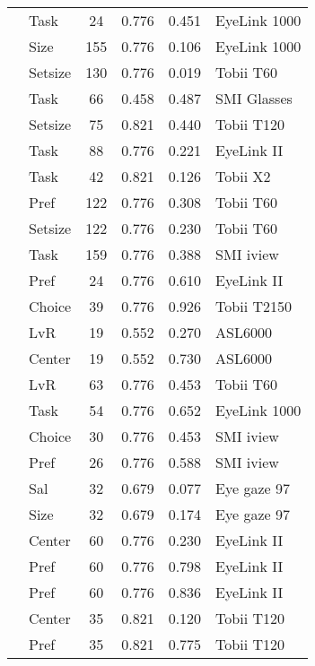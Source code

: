 \begin{longtable}{p{8cm}lcccl}
  \cite{glaholt2012} & Task & 24 & 0.776 & 0.451 & EyeLink 1000 \\ 
  \cite{graham2016} & Size & 155 & 0.776 & 0.106 & EyeLink 1000 \\ 
  \cite{grebitus2015} & Setsize & 130 & 0.776 & 0.019 & Tobii T60 \\ 
  \cite{guyader2017} & Task & 66 & 0.458 & 0.487 & SMI Glasses \\ 
  \cite{hong2016a} & Setsize & 75 & 0.821 & 0.440 & Tobii T120 \\ 
  \cite{huang2011} & Task & 88 & 0.776 & 0.221 & EyeLink II \\ 
  \cite{hwang2017} & Task & 42 & 0.821 & 0.126 & Tobii X2 \\ 
  \cite{jenke2019} & Pref & 122 & 0.776 & 0.308 & Tobii T60 \\ 
  \cite{jenke2019} & Setsize & 122 & 0.776 & 0.230 & Tobii T60 \\ 
  \cite{keller2014} & Task & 159 & 0.776 & 0.388 & SMI iview \\ 
  \cite{kim2012a} & Pref & 24 & 0.776 & 0.610 & EyeLink II \\ 
  \cite{krajbich2010a} & Choice & 39 & 0.776 & 0.926 & Tobii T2150 \\ 
  \cite{kreplin2014a} & LvR & 19 & 0.552 & 0.270 & ASL6000 \\ 
  \cite{kreplin2014a} & Center & 19 & 0.552 & 0.730 & ASL6000 \\ 
  \cite{kwak2018} & LvR & 63 & 0.776 & 0.453 & Tobii T60 \\ 
  \cite{leboeuf2016} & Task & 54 & 0.776 & 0.652 & EyeLink 1000 \\ 
  \cite{lindner2014} & Choice & 30 & 0.776 & 0.453 & SMI iview \\ 
  \cite{lindner2014} & Pref & 26 & 0.776 & 0.588 & SMI iview \\ 
  \cite{lohse1997a} & Sal & 32 & 0.679 & 0.077 & Eye gaze 97 \\ 
  \cite{lohse1997a} & Size & 32 & 0.679 & 0.174 & Eye gaze 97 \\ 
  \cite{meissner2016a} & Center & 60 & 0.776 & 0.230 & EyeLink II \\ 
  \cite{meissner2016a} & Pref & 60 & 0.776 & 0.798 & EyeLink II \\ 
  \cite{meissner2016a} & Pref & 60 & 0.776 & 0.836 & EyeLink II \\ 
  \cite{meissner2016a} & Center & 35 & 0.821 & 0.120 & Tobii T120 \\ 
  \cite{meissner2016a} & Pref & 35 & 0.821 & 0.775 & Tobii T120 \\ 

\end{longtable}
